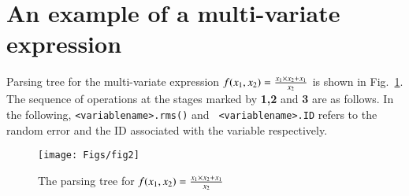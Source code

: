 \documentclass[11pt]{article}
\begin{document}
\section{An example of a multi-variate expression}
\label{APPEN:EX}
Parsing tree for the multi-variate expression $f(x_1,x_2)={x_1\times
x_2+x_1 \over {x_2}}$ is shown in Fig.~\ref{EX2}.  The sequence of
operations at the stages marked by {\bf 1,2} and {\bf 3} are as
follows.  In the following, {\tt <variablename>.rms()} and {\tt
<variablename>.ID} refers to the random error and the ID associated
with the variable respectively.
\begin{figure}[t]
\begin{center}
  \texttt{[image: Figs/fig2]}
\caption[]{The parsing tree for $f(x_1,x_2)={x_1\times x_2+x_1 \over {x_2}}$}
\label{EX2}
\end{center}
\end{figure}
\end{document}
